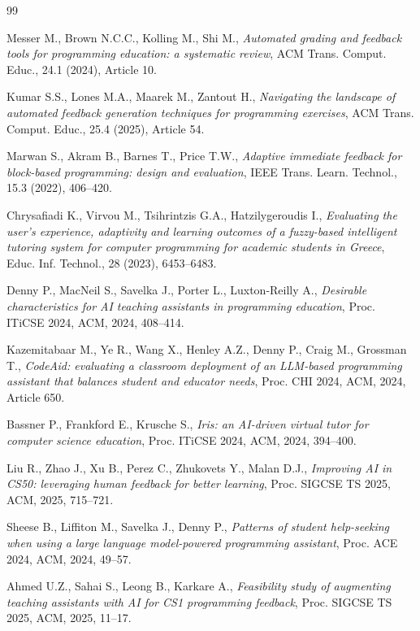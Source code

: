 \documentclass[twoside, 11pt]{article}
\begin{document}
\begin{thebibliography}{99}
\thispagestyle{myheadings}
\vspace*{0mm} \itemsep=-2pt
\footnotesize

 Messer M., Brown N.C.C., Kolling M., Shi M., {\it Automated grading and feedback tools for programming education: a systematic review}, ACM Trans. Comput. Educ., 24.1 (2024), Article 10.

 Kumar S.S., Lones M.A., Maarek M., Zantout H., {\it Navigating the landscape of automated feedback generation techniques for programming exercises}, ACM Trans. Comput. Educ., 25.4 (2025), Article 54.

 Marwan S., Akram B., Barnes T., Price T.W., {\it Adaptive immediate feedback for block-based programming: design and evaluation}, IEEE Trans. Learn. Technol., 15.3 (2022), 406--420.

 Chrysafiadi K., Virvou M., Tsihrintzis G.A., Hatzilygeroudis I., {\it Evaluating the user's experience, adaptivity and learning outcomes of a fuzzy-based intelligent tutoring system for computer programming for academic students in Greece}, Educ. Inf. Technol., 28 (2023), 6453--6483.

 Denny P., MacNeil S., Savelka J., Porter L., Luxton-Reilly A., {\it Desirable characteristics for AI teaching assistants in programming education}, Proc. ITiCSE 2024, ACM, 2024, 408--414.

 Kazemitabaar M., Ye R., Wang X., Henley A.Z., Denny P., Craig M., Grossman T., {\it CodeAid: evaluating a classroom deployment of an LLM-based programming assistant that balances student and educator needs}, Proc. CHI 2024, ACM, 2024, Article 650.

 Bassner P., Frankford E., Krusche S., {\it Iris: an AI-driven virtual tutor for computer science education}, Proc. ITiCSE 2024, ACM, 2024, 394--400.

 Liu R., Zhao J., Xu B., Perez C., Zhukovets Y., Malan D.J., {\it Improving AI in CS50: leveraging human feedback for better learning}, Proc. SIGCSE TS 2025, ACM, 2025, 715--721.

 Sheese B., Liffiton M., Savelka J., Denny P., {\it Patterns of student help-seeking when using a large language model-powered programming assistant}, Proc. ACE 2024, ACM, 2024, 49--57.

 Ahmed U.Z., Sahai S., Leong B., Karkare A., {\it Feasibility study of augmenting teaching assistants with AI for CS1 programming feedback}, Proc. SIGCSE TS 2025, ACM, 2025, 11--17.


\end{thebibliography}
\end{document}
